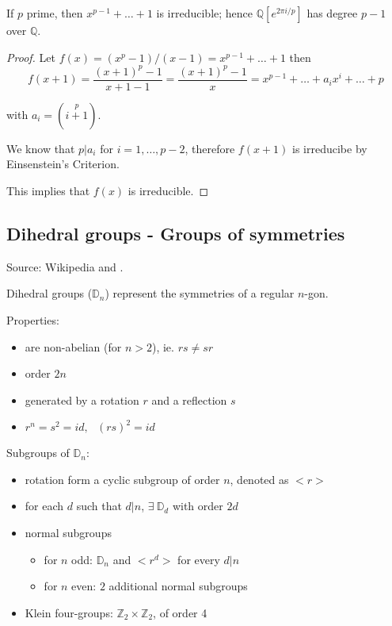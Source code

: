\documentclass{article}
\theoremstyle{definition}
\newenvironment{lemma}[1]
{\renewcommand\theinnerlemma{#1}\innerlemma}
{\endinnerlemma}
\begin{document}
\begin{lemma}{1.42}
  If $p$ prime, then $x^{p-1} + \ldots + 1$ is irreducible; hence $\mathbb{Q}[e^{2 \pi i /p}]$ has degree $p-1$ over $\mathbb{Q}$.
\end{lemma}
\begin{proof}
  Let $f(x) = (x^p - 1)/(x-1) = x^{p-1} + \ldots + 1$
  then
  $$
  f(x+1) = \frac{(x+1)^p -1}{x+1-1} = \frac{(x+1)^p -1}{x} = x^{p-1} + \ldots + a_i x^i + \ldots + p
  $$

  with $a_i = \left( \stackrel{p}{i+1} \right)$.

  We know that $p | a_i$ for $i= 1, \ldots, p-2$, therefore $f(x+1)$ is irreducibe by Einsenstein's Criterion.

  This implies that $f(x)$ is irreducible.
\end{proof}


\subsection{Dihedral groups - Groups of symmetries} \label{dihedral}
Source: Wikipedia and \cite{dihedral}.

Dihedral groups ($\mathbb{D}_n$) represent the symmetries of a regular $n$-gon.

Properties:
\begin{itemize}
  \item are non-abelian (for $n>2$), ie. $rs \neq sr$
  \item order $2n$
  \item generated by a rotation $r$ and a reflection $s$
  \item $r^n = s^2 = id,~~~(rs)^2=id$
\end{itemize}
Subgroups of $\mathbb{D}_n$:
\begin{itemize}
  \item rotation form a cyclic subgroup of order $n$, denoted as $<r>$
  \item for each $d$ such that $d|n$, $\exists~ \mathbb{D}_d$ with order $2d$
  \item normal subgroups
    \begin{itemize}
      \item for $n$ odd: $\mathbb{D}_n$ and $<r^d>$ for every $d|n$
      \item for $n$ even: $2$ additional normal subgroups
    \end{itemize}
  \item Klein four-groups: $\mathbb{Z}_2 \times \mathbb{Z}_2$, of order 4
\end{itemize}
\end{document}
